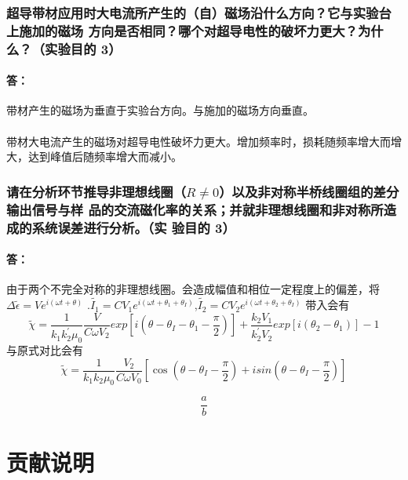 \documentclass{ctexart}                                     %
\theoremstyle{ansstyle}
\begin{document}
\subsubsection{ 超导带材应用时大电流所产生的（自）磁场沿什么方向？它与实验台上施加的磁场
    方向是否相同？哪个对超导电性的破坏力更大？为什么？（实验目的 3） }
\paragraph{答：}
带材产生的磁场为垂直于实验台方向。与施加的磁场方向垂直。
\paragraph{}带材大电流产生的磁场对超导电性破坏力更大。增加频率时，损耗随频率增大而增大，达到峰值后随频率增大而减小。
\subsubsection{请在分析环节推导非理想线圈（$R \neq 0$）以及非对称半桥线圈组的差分输出信号与样
    品的交流磁化率的关系；并就非理想线圈和非对称所造成的系统误差进行分析。（实
    验目的 3）
}
\paragraph{答：}由于两个不完全对称的非理想线圈。会造成幅值和相位一定程度上的偏差，将$\Delta \widetilde{\epsilon}=Ve^{i(\omega t + \theta)}$
.$\widetilde{I_{1}}= CV_{1}e^{i(\omega t + \theta_{1}+\theta_{I})}$,$\widetilde{I_{2}}= CV_{2}e^{i(\omega t + \theta_{2}+\theta_{I})}$
带入会有$$
    \widetilde{\chi}=\frac{1}{k_{1}k^{'}_{2}\mu_{0}}\frac{V}{C\omega V_{2}}exp[i(\theta -\theta_{I}-\theta_{1}-\frac{\pi}{2})]+\frac{k_{2}V_{1}}{k^{'}_{2}V_{2}}exp[i(\theta_{2}-\theta_{1})] -1$$
与原式对比会有
$$ \widetilde{\chi} =\frac{1}{k_{1}k_{2}\mu_{0}}\frac{V_{2}}{C\omega V_{0}}[\cos(\theta-\theta_{I}-\frac{\pi}{2})+isin(\theta-\theta_{I}-\frac{\pi}{2})]    $$



\appendix
\begin{equation}
    \dfrac{a}{b}
\end{equation}

\section{贡献说明}
\end{document}
